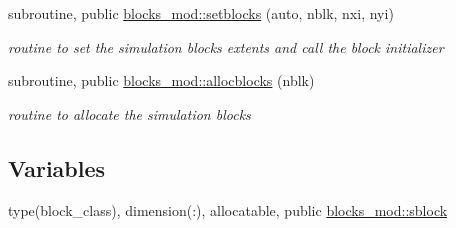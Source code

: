 \begin{DoxyCompactItemize}
subroutine, public \mbox{\hyperlink{namespaceblocks__mod_a8f5a5d9e6cfd16cfd1b179092a204696}{blocks\+\_\+mod\+::setblocks}} (auto, nblk, nxi, nyi)
\begin{DoxyCompactList}\small\item\em routine to set the simulation blocks extents and call the block initializer \end{DoxyCompactList}\item 
subroutine, public \mbox{\hyperlink{namespaceblocks__mod_a639beb0fee2290d46353f4b4702d6711}{blocks\+\_\+mod\+::allocblocks}} (nblk)
\begin{DoxyCompactList}\small\item\em routine to allocate the simulation blocks \end{DoxyCompactList}\end{DoxyCompactItemize}
\subsection*{Variables}
\begin{DoxyCompactItemize}
\item 
type(block\+\_\+class), dimension(\+:), allocatable, public \mbox{\hyperlink{namespaceblocks__mod_a13b3fc755dfbf3e333490a3f931b28aa}{blocks\+\_\+mod\+::sblock}}
\end{DoxyCompactItemize}
